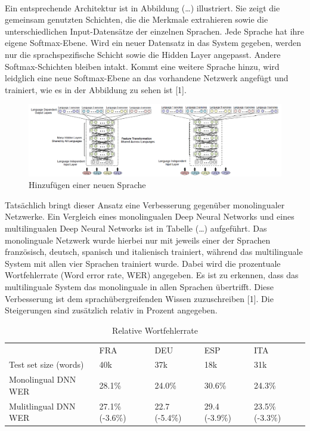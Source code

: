 \\ 
Ein entsprechende Architektur ist in Abbildung (…) illustriert. Sie zeigt die gemeinsam genutzten Schichten, die die Merkmale extrahieren sowie die unterschiedlichen Input-Datensätze der einzelnen Sprachen. Jede Sprache hat ihre eigene Softmax-Ebene. Wird ein neuer Datensatz in das System gegeben, werden nur die sprachspezifische Schicht sowie die Hidden Layer angepasst. Andere Softmax-Schichten bleiben intakt. Kommt eine weitere Sprache hinzu, wird leidglich eine neue Softmax-Ebene an das vorhandene Netzwerk angefügt und trainiert, wie es in der Abbildung zu sehen ist [1]. 

\begin{figure}[h!]
	\centering
	\includegraphics[width=1.0\linewidth]{images/shared_hidden_layer}
	\caption{Hinzufügen einer neuen Sprache  \cite{GonzalezDominguez.2015}} %
	\label{fig:topology}
\end{figure}

Tatsächlich bringt dieser Ansatz eine Verbesserung gegenüber monolingualer Netzwerke. Ein Vergleich eines monolingualen Deep Neural Networks und eines multilingualen Deep Neural Networks ist in Tabelle (…) aufgeführt. Das monolinguale Netzwerk wurde hierbei nur mit jeweils einer der Sprachen französisch, deutsch, spanisch und italienisch trainiert, während das multilinguale System mit allen vier Sprachen trainiert wurde. Dabei wird die prozentuale Wortfehlerrate (Word error rate, WER) angegeben. Es ist zu erkennen, dass das multilinguale System das monolinguale in allen Sprachen übertrifft. Diese Verbesserung ist dem sprachübergreifenden Wissen zuzuschreiben [1]. Die Steigerungen sind zusätzlich relativ in Prozent angegeben. 

\begin{table}[h!]
	\begin{tabular}{lllll}
		& FRA             & DEU           & ESP           & ITA             \\
		Test set size (words) & 40k             & 37k           & 18k           & 31k             \\
		Monolingual DNN WER   & 28.1\%          & 24.0\%        & 30.6\%        & 24.3\%          \\
		Mulitlingual DNN WER  & 27.1\% (-3.6\%) & 22.7 (-5.4\%) & 29.4 (-3.9\%) & 23.5\% (-3.3\%)
	\end{tabular}
	\centering
	\caption{Relative Wortfehlerrate}
	\label{my-label}
\end{table}

